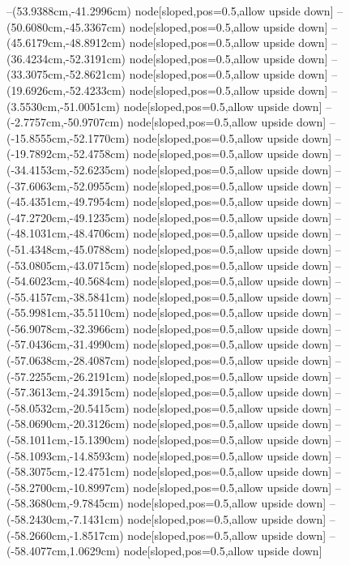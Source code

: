 --(53.9388cm,-41.2996cm) node[sloped,pos=0.5,allow upside down]{\ArrowIn}
--(50.6080cm,-45.3367cm) node[sloped,pos=0.5,allow upside down]{\ArrowIn}
--(45.6179cm,-48.8912cm) node[sloped,pos=0.5,allow upside down]{\ArrowIn}
--(36.4234cm,-52.3191cm) node[sloped,pos=0.5,allow upside down]{\ArrowIn}
--(33.3075cm,-52.8621cm) node[sloped,pos=0.5,allow upside down]{\ArrowIn}
--(19.6926cm,-52.4233cm) node[sloped,pos=0.5,allow upside down]{\ArrowIn}
--(3.5530cm,-51.0051cm) node[sloped,pos=0.5,allow upside down]{\ArrowIn}
--(-2.7757cm,-50.9707cm) node[sloped,pos=0.5,allow upside down]{\ArrowIn}
--(-15.8555cm,-52.1770cm) node[sloped,pos=0.5,allow upside down]{\ArrowIn}
--(-19.7892cm,-52.4758cm) node[sloped,pos=0.5,allow upside down]{\ArrowIn}
--(-34.4153cm,-52.6235cm) node[sloped,pos=0.5,allow upside down]{\ArrowIn}
--(-37.6063cm,-52.0955cm) node[sloped,pos=0.5,allow upside down]{\ArrowIn}
--(-45.4351cm,-49.7954cm) node[sloped,pos=0.5,allow upside down]{\ArrowIn}
--(-47.2720cm,-49.1235cm) node[sloped,pos=0.5,allow upside down]{\ArrowIn}
--(-48.1031cm,-48.4706cm) node[sloped,pos=0.5,allow upside down]{\ArrowIn}
--(-51.4348cm,-45.0788cm) node[sloped,pos=0.5,allow upside down]{\ArrowIn}
--(-53.0805cm,-43.0715cm) node[sloped,pos=0.5,allow upside down]{\ArrowIn}
--(-54.6023cm,-40.5684cm) node[sloped,pos=0.5,allow upside down]{\ArrowIn}
--(-55.4157cm,-38.5841cm) node[sloped,pos=0.5,allow upside down]{\ArrowIn}
--(-55.9981cm,-35.5110cm) node[sloped,pos=0.5,allow upside down]{\ArrowIn}
--(-56.9078cm,-32.3966cm) node[sloped,pos=0.5,allow upside down]{\ArrowIn}
--(-57.0436cm,-31.4990cm) node[sloped,pos=0.5,allow upside down]{\arrowIn}
--(-57.0638cm,-28.4087cm) node[sloped,pos=0.5,allow upside down]{\ArrowIn}
--(-57.2255cm,-26.2191cm) node[sloped,pos=0.5,allow upside down]{\ArrowIn}
--(-57.3613cm,-24.3915cm) node[sloped,pos=0.5,allow upside down]{\ArrowIn}
--(-58.0532cm,-20.5415cm) node[sloped,pos=0.5,allow upside down]{\ArrowIn}
--(-58.0690cm,-20.3126cm) node[sloped,pos=0.5,allow upside down]{\arrowIn}
--(-58.1011cm,-15.1390cm) node[sloped,pos=0.5,allow upside down]{\ArrowIn}
--(-58.1093cm,-14.8593cm) node[sloped,pos=0.5,allow upside down]{\arrowIn}
--(-58.3075cm,-12.4751cm) node[sloped,pos=0.5,allow upside down]{\ArrowIn}
--(-58.2700cm,-10.8997cm) node[sloped,pos=0.5,allow upside down]{\ArrowIn}
--(-58.3680cm,-9.7845cm) node[sloped,pos=0.5,allow upside down]{\ArrowIn}
--(-58.2430cm,-7.1431cm) node[sloped,pos=0.5,allow upside down]{\ArrowIn}
--(-58.2660cm,-1.8517cm) node[sloped,pos=0.5,allow upside down]{\ArrowIn}
--(-58.4077cm,1.0629cm) node[sloped,pos=0.5,allow upside down]{\ArrowIn}
